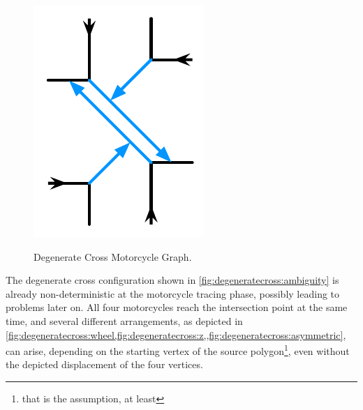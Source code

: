 \documentclass[12pt,a4paper,oneside,openany]{article}
\begin{document}
\begin{figure}[htpb]
\begin{center}
{		\includegraphics[scale=0.6667]{fig-degenerate-cross3.pdf}
		\label{fig:degeneratecross:z}}
\caption{Degenerate Cross Motorcycle Graph.}
\label{fig:degeneratecross}
\end{center}
\end{figure}


The degenerate cross configuration shown in \cref{fig:degeneratecross:ambiguity} is already non-deterministic at the motorcycle tracing phase, possibly leading to problems later on. All four motorcycles reach the intersection point at the same time, and several different arrangements, as depicted in \cref{fig:degeneratecross:wheel,fig:degeneratecross:z,,fig:degeneratecross:asymmetric}, can arise, depending on the starting vertex of the source polygon\footnote{that is the assumption, at least}, even without the depicted displacement of the four vertices.
\end{document}
